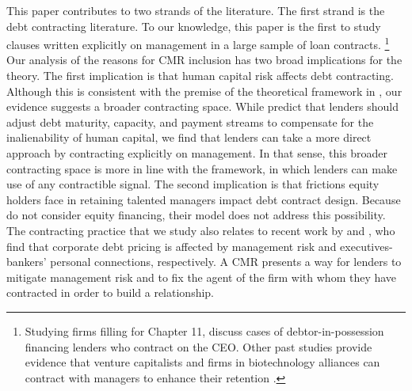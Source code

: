 \documentclass[a4paper,12pt]{article}
\begin{document}
This paper contributes to two strands of the literature.
The first strand is the debt contracting literature.
To our knowledge, this paper is the first to study clauses written explicitly on management in a large sample of loan contracts.%
    \footnote{Studying firms filling for Chapter 11, \cite{Eckbo_2016} discuss cases of debtor-in-possession financing lenders who contract on the CEO.
    Other past studies provide evidence that venture capitalists and firms in biotechnology alliances can contract with managers to enhance their retention \citep{Kaplan_2003, Robinson_2007}.}
Our analysis of the reasons for CMR inclusion has two broad implications for the theory.
The first implication is that human capital risk affects debt contracting.
Although this is consistent with the premise of the theoretical framework in \cite{Hart_1994}, our evidence suggests a broader contracting space.
While \cite{Hart_1994} predict that lenders should adjust debt maturity, capacity, and payment streams to compensate for the inalienability of human capital, we find that lenders can take a more direct approach by contracting explicitly on management.
In that sense, this broader contracting space is more in line with the \cite{Aghion_1992} framework, in which lenders can make use of any contractible signal.
The second implication is that frictions equity holders face in retaining talented managers impact debt contract design.
Because \cite{Hart_1994} do not consider equity financing, their model does not address this possibility.
The contracting practice that we study also relates to recent work by  \cite{Pan_2018} and \cite{Karolyi_2018}, who find that corporate debt pricing is affected by management risk and executives-bankers' personal connections, respectively.
A CMR presents a way for lenders to mitigate management risk and to fix the agent of the firm with whom they have contracted in order to build a relationship.
\end{document}
